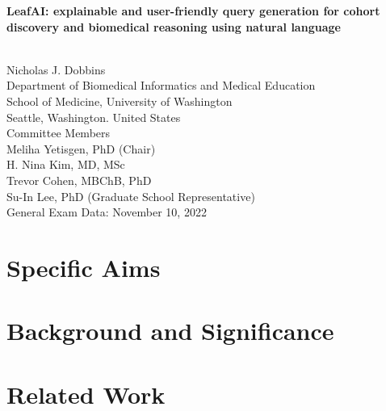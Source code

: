 \documentclass[12pt]{article} %
\begin{document}
\begin{titlepage}
    \begin{center}
        \vspace*{1cm}
        \begin{huge}
            \textbf{LeafAI: explainable and user-friendly query generation for cohort discovery and biomedical reasoning using natural language}
        \end{huge} \\
        \vspace{0.7cm}
        Nicholas J. Dobbins \\
        Department of Biomedical Informatics and Medical Education \\
        School of Medicine, University of Washington \\
        Seattle, Washington. United States \\
        \vspace{0.7cm}
        Committee Members \\
        Meliha Yetisgen, PhD (Chair) \\
        H. Nina Kim, MD, MSc \\
        Trevor Cohen, MBChB, PhD \\
        Su-In Lee, PhD (Graduate School Representative) \\
        \vspace{0.7cm}
        General Exam Data: November 10, 2022
    \end{center}
\end{titlepage}

\tableofcontents
\thispagestyle{empty}
\newpage
\addtocounter{page}{-1}
 
\section{Specific Aims}
\label{sec:specific_aims}

\newpage

\section{Background and Significance}
\label{sec:background}


\section{Related Work}
\label{sec:related_work}

\end{document}

